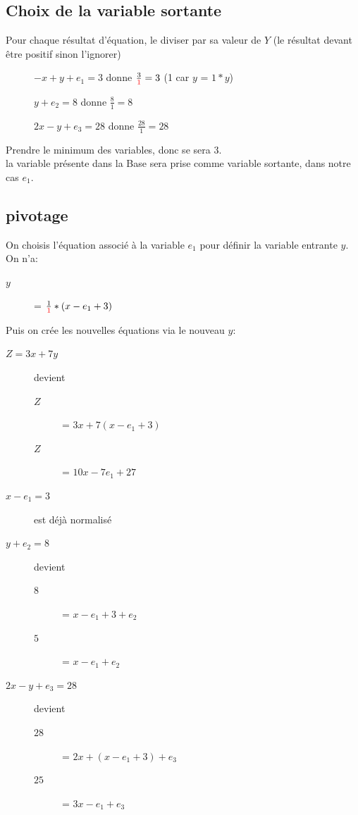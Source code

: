 \subsection{Choix de la variable sortante}
Pour chaque résultat d'équation, le diviser par sa valeur de $Y$ (le résultat devant être positif sinon l'ignorer)\\

\begin{description}
\item[] $ -x + y + e_1 = 3$ donne $\frac{3}{\textcolor{red}{1}} = 3$ (1 car $y$ = $1*y$)
\item[] $ y + e_2 = 8$ donne $\frac{8}{1} = 8$
\item[] $ 2x - y + e_3 = 28$ donne $\frac{28}{1} = 28$
\end{description}
Prendre le minimum des variables, donc se sera $3$.\\
la variable présente dans la Base sera prise comme variable sortante, dans notre cas $e_1$.\\
\pagebreak
\subsection{pivotage}
On choisis l'équation associé à la variable $e_1$ pour définir la variable entrante $y$.\\
On n'a:
\begin{description}
\item[$y$] = $\frac{1}{\textcolor{red}{1}}*(x - e_1 + 3)$
\end{description}

Puis on crée les nouvelles équations via le nouveau $y$:
\begin{description}
\item[$Z = 3x + 7y$] devient
\begin{description}
\item[$Z$] = $3x + 7(x - e_1 + 3)$
\item[$Z$] = $10x - 7e_1 + 27$
\end{description}
\item[$x - e_1 = 3$] est déjà normalisé
\item[$y + e_2 = 8$] devient
\begin{description}
\item[$8$] = $x -e_1 + 3 + e_2$
\item[$5$] = $x - e_1 + e_2$
\end{description}
\item[$2x - y + e_3 = 28$] devient
\begin{description}
\item[$28$] = $2x + (x - e_1 + 3) + e_3$
\item[$25$] = $3x - e_1 + e_3$
\end{description}
\end{description}
